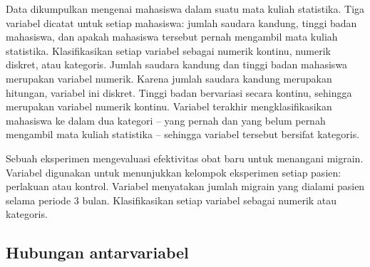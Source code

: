 \begin{examplewrap}
\begin{nexample}{Data dikumpulkan mengenai mahasiswa
    dalam suatu mata kuliah statistika.
    Tiga variabel dicatat untuk setiap mahasiswa:
    jumlah saudara kandung, tinggi badan mahasiswa, dan apakah
    mahasiswa tersebut pernah mengambil mata kuliah statistika.
    Klasifikasikan setiap variabel sebagai numerik kontinu,
    numerik diskret, atau kategoris.}
  Jumlah saudara kandung dan tinggi badan mahasiswa merupakan
  variabel numerik.
  Karena jumlah saudara kandung merupakan hitungan, variabel ini diskret.
  Tinggi badan bervariasi secara kontinu, sehingga merupakan variabel
  numerik kontinu.
  Variabel terakhir mengklasifikasikan mahasiswa ke dalam dua kategori
  -- yang pernah dan yang belum pernah mengambil mata kuliah statistika --
  sehingga variabel tersebut bersifat kategoris.
\end{nexample}
\end{examplewrap}

\begin{exercisewrap}
\begin{nexercise}%
Sebuah eksperimen mengevaluasi efektivitas obat baru
untuk menangani migrain.
Variabel  digunakan untuk menunjukkan kelompok eksperimen
setiap pasien: perlakuan atau kontrol.
Variabel \mbox{} menyatakan jumlah
migrain yang dialami pasien selama periode 3 bulan.
\mbox{Klasifikasikan} setiap variabel sebagai numerik atau
kategoris.\footnotemark
\end{nexercise}
\end{exercisewrap}


\D{\newpage}

\subsection{Hubungan antarvariabel}
\label{variableRelations}


